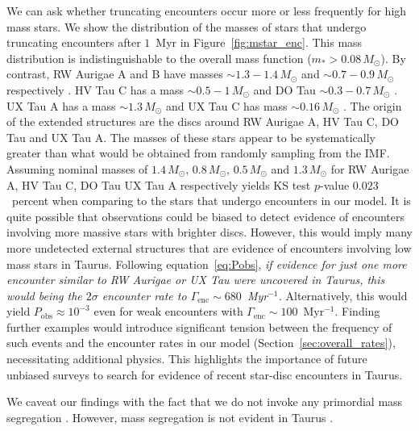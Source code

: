 \documentclass{aa}
\begin{document}
We can ask whether truncating encounters occur more or less frequently for high mass stars. We show the distribution of the masses of stars that undergo truncating encounters after $1$~Myr in Figure~\ref{fig:mstar_enc}. This mass distribution is indistinguishable to the overall mass function ($m_*>0.08 \, M_\odot$). By contrast, RW Aurigae A and B have masses $\sim 1.3-1.4\, M_\odot$ and  $\sim 0.7-0.9 \, M_\odot$ respectively \citep{Ghez97, Woitas01}. HV Tau C has a mass $\sim 0.5-1 \, M_\odot$ \citep{Duchene10} and DO Tau $\sim 0.3 - 0.7 \, M_\odot$ \citep{Beckwith90, Hartigan95}. UX Tau A has a mass $\sim 1.3 \, M_\odot$ and UX Tau C has mass $\sim 0.16 \, M_\odot$ \citep[][]{Kraus09, Zapata20}. The origin of the extended structures are the discs around RW Aurigae A, HV Tau C, DO Tau and UX Tau A. The masses of these stars appear to be systematically greater than what would be obtained from randomly sampling from the IMF. Assuming nominal masses of $1.4 \, M_\odot$, $0.8 \, M_\odot$, $0.5 \, M_\odot$ and  $1.3 \, M_\odot$ for RW Aurigae A, HV Tau C, DO Tau UX Tau A respectively yields KS test $p$-value $0.023$~percent when comparing to the stars that undergo encounters in our model. It is quite possible that observations could be biased to detect evidence of encounters involving more massive stars with brighter discs. However, this would imply many more undetected external structures that are evidence of encounters involving low mass stars in Taurus. Following equation~\ref{eq:Pobs}, \textit{if evidence for just one more encounter similar to RW Aurigae or UX Tau were uncovered in Taurus, this would being the $2\sigma$ encounter rate to $\Gamma_\mathrm{enc} \sim 680$~Myr$^{-1}$.} Alternatively, this would yield $P_\mathrm{obs}\approx 10^{-3}$ even for weak encounters with $\Gamma_\mathrm{enc} \sim 100$~Myr$^{-1}$. Finding further examples would introduce significant tension between the frequency of such events and the encounter rates in our model (Section~\ref{sec:overall_rates}), necessitating additional physics. This highlights the importance of future unbiased surveys to search for evidence of recent star-disc encounters in Taurus. 

We caveat our findings with the fact that we do not invoke any primordial mass segregation \citep{Zinnecker93, Moeckel10, Plunckett18}. However, mass segregation is not evident in Taurus \citep{Dib19}. 
\end{document}
